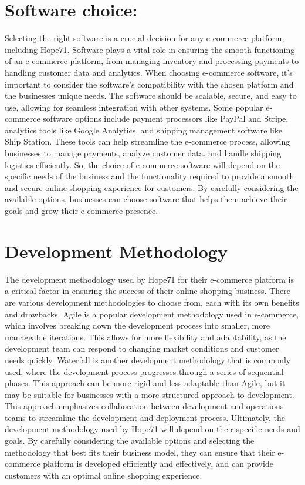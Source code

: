 \documentclass{article}
\begin{document}
\section{Software choice:}
Selecting the right software is a crucial decision for any e-commerce platform, including Hope71. Software plays a vital role in ensuring the smooth functioning of an e-commerce platform, from managing inventory and processing payments to handling customer data and analytics. When choosing e-commerce software, it's important to consider the software's compatibility with the chosen platform and the businesses unique needs. The software should be scalable, secure, and easy to use, allowing for seamless integration with other systems. Some popular e-commerce software options include payment processors like PayPal and Stripe, analytics tools like Google Analytics, and shipping management software like Ship Station. These tools can help streamline the e-commerce process, allowing businesses to manage payments, analyze customer data, and handle shipping logistics efficiently. So, the choice of e-commerce software will depend on the specific needs of the business and the functionality required to provide a smooth and secure online shopping experience for customers. By carefully considering the available options, businesses can choose software that helps them achieve their goals and grow their e-commerce presence.
\section{Development Methodology}
The development methodology used by Hope71 for their e-commerce platform is a critical factor in ensuring the success of their online shopping business. There are various development methodologies to choose from, each with its own benefits and drawbacks. Agile is a popular development methodology used in e-commerce, which involves breaking down the development process into smaller, more manageable iterations. This allows for more flexibility and adaptability, as the development team can respond to changing market conditions and customer needs quickly. Waterfall is another development methodology that is commonly used, where the development process progresses through a series of sequential phases. This approach can be more rigid and less adaptable than Agile, but it may be suitable for businesses with a more structured approach to development. This approach emphasizes collaboration between development and operations teams to streamline the development and deployment process. Ultimately, the development methodology used by Hope71 will depend on their specific needs and goals. By carefully considering the available options and selecting the methodology that best fits their business model, they can ensure that their e-commerce platform is developed efficiently and effectively, and can provide customers with an optimal online shopping experience.
\end{document}
